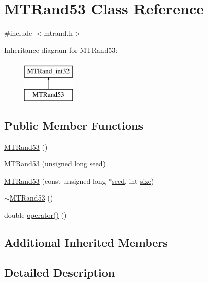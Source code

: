 \hypertarget{class_m_t_rand53}{\section{M\-T\-Rand53 Class Reference}
\label{class_m_t_rand53}
}


{\ttfamily \#include $<$mtrand.\-h$>$}

Inheritance diagram for M\-T\-Rand53\-:\begin{figure}[H]
\begin{center}
\leavevmode
\includegraphics[height=2.000000cm]{class_m_t_rand53}
\end{center}
\end{figure}
\subsection*{Public Member Functions}
\begin{DoxyCompactItemize}
\item 
\hyperlink{class_m_t_rand53_a24711c9e6e5ee72715f34515d1f1939a}{M\-T\-Rand53} ()
\item 
\hyperlink{class_m_t_rand53_ad800887e15d4095f22facdb67f270c5e}{M\-T\-Rand53} (unsigned long \hyperlink{class_m_t_rand__int32_a0c57076fe30358e0700a7ce1baa0ea27}{seed})
\item 
\hyperlink{class_m_t_rand53_ac77b190d3ac27adea2d2c6c2ce2347c3}{M\-T\-Rand53} (const unsigned long $\ast$\hyperlink{class_m_t_rand__int32_a0c57076fe30358e0700a7ce1baa0ea27}{seed}, int \hyperlink{crea__e__controlla__i__catalizzatori_8m_ae113ea7f9e515a12ac4b5595c6faf61e}{size})
\item 
\hyperlink{class_m_t_rand53_a947a6a7afd0c8a17612cda3faa705a75}{$\sim$\-M\-T\-Rand53} ()
\item 
double \hyperlink{class_m_t_rand53_ab6657cb5349f39bc4553d3a970458b45}{operator()} ()
\end{DoxyCompactItemize}
\subsection*{Additional Inherited Members}


\subsection{Detailed Description}


